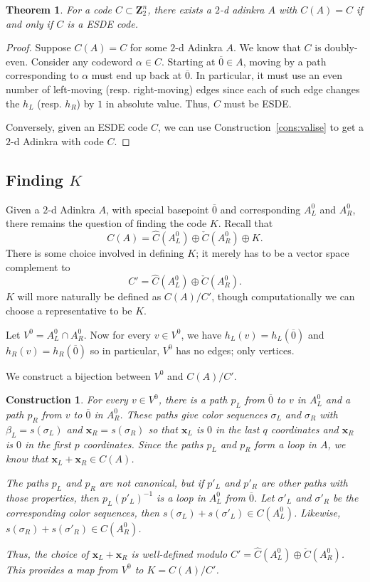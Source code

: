 \documentclass[12pt,twoside,singlespace]{article}
\numberwithin{equation}{section}
\newtheorem{thm}[equation]{Theorem}
\newtheorem{construction}[equation]{Construction}
\theoremstyle{definition}
\newcommand{\ZZ}{\mathbf{Z}}
\renewcommand{\vec}[1]{\mathbf{#1}}
\begin{document}
\begin{thm}
\label{thm:esde}
For a code $C \subset \ZZ_2^n$, there exists a $2$-d adinkra $A$ with $C(A) = C$ if and only if $C$ is a ESDE code.
\end{thm}
\begin{proof}
Suppose $C(A) = C$ for some $2$-d Adinkra $A$. We know that $C$ is doubly-even. Consider any codeword $\alpha \in C$. Starting at $\overline{0} \in A$, moving by a path corresponding to $\alpha$ must end up back at $\overline{0}$. In particular, it must use an even number of left-moving (resp. right-moving) edges since each of such edge changes the $h_L$ (resp. $h_R$) by $1$ in absolute value. Thus, $C$ must be ESDE.

Conversely, given an ESDE code $C$, we can use Construction~\ref{cons:valise} to get a $2$-d Adinkra with code $C$.
\end{proof}


\subsection{Finding $K$}
Given a $2$-d Adinkra $A$, with special basepoint $\overline{0}$ and corresponding $A_L^0$ and $A_R^0$, there remains the question of finding the code $K$.  Recall that
\[C(A)=\hat{C}(A_L^0)\oplus\check{C}(A_R^0)\oplus K.\]
There is some choice involved in defining $K$; it merely has to be a vector space complement to
\[C'=\hat{C}(A_L^0)\oplus\check{C}(A_R^0).\]
$K$ will more naturally be defined as $C(A)/C'$, though computationally we can choose a representative to be $K$.


Let $V^0=A_L^0\cap A_R^0$.  Now for every $v\in V^0$, we have $h_L(v)=h_L(\overline{0})$ and $h_R(v)=h_R(\overline{0})$ so in particular, $V^0$ has no edges; only vertices.

We construct a bijection between $V^0$ and $C(A)/C'$.

\begin{construction}
\label{cons:findk}
For every $v\in V^0$, there is a path $p_L$ from $\overline{0}$ to $v$ in $A_L^0$ and a path $p_R$ from $v$ to $\overline{0}$ in $A_R^0$.  These paths give color sequences $\sigma_L$ and $\sigma_R$ with $\beta_L=s(\sigma_L)$ and $\vec{x}_R=s(\sigma_R)$ so that $\vec{x}_L$ is $0$ in the last $q$ coordinates and $\vec{x}_R$ is $0$ in the first $p$ coordinates.  Since the paths $p_L$ and $p_R$ form a loop in $A$, we know that $\vec{x}_L+\vec{x}_R\in C(A)$.

The paths $p_L$ and $p_R$ are not canonical, but if $p'_L$ and $p'_R$ are other paths with those properties, then $p_L(p'_L)^{-1}$ is a loop in $A_L^0$ from $\overline{0}$.  Let $\sigma'_L$ and $\sigma'_R$ be the corresponding color sequences, then $s(\sigma_L)+s(\sigma'_L)\in C(A_L^0)$.  Likewise, $s(\sigma_R)+s(\sigma'_R)\in C(A_R^0)$.

Thus, the choice of $\vec{x}_L+\vec{x}_R$ is well-defined modulo $C'=\hat{C}(A_L^0)\oplus \check{C}(A_R^0)$.  This provides a map from $V^0$ to $K=C(A)/C'$.
\end{construction}
\end{document}
